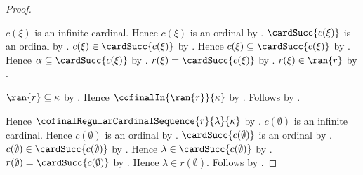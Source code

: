 \begin{proof}
\begin{subproof}
\begin{subproof}
            $c(\xi)$ is an infinite cardinal.
            Hence $c(\xi)$ is an ordinal by
                .
            $\cardSucc{c(\xi)}$ is an ordinal by
                .
            $c(\xi)\in\cardSucc{c(\xi)}$ by
                .
            Hence $c(\xi)\subseteq\cardSucc{c(\xi)}$ by
                .
            Hence $\alpha\subseteq\cardSucc{c(\xi)}$ by
                .
            $r(\xi)=\cardSucc{c(\xi)}$ by
                .
            $r(\xi)\in\ran{r}$ by .
        \end{subproof}
        $\ran{r}\subseteq\kappa$ by .
        Hence $\cofinalIn{\ran{r}}{\kappa}$ by .
        Follows by .
    \end{subproof}
    Hence $\cofinalRegularCardinalSequence{r}{\lambda}{\kappa}$ by
        .
    $c(\emptyset)$ is an infinite cardinal.
    Hence $c(\emptyset)$ is an ordinal by
        .
    $\cardSucc{c(\emptyset)}$ is an ordinal by
        .
    $c(\emptyset)\in\cardSucc{c(\emptyset)}$ by
        .
    Hence $\lambda\in\cardSucc{c(\emptyset)}$ by
        .
    $r(\emptyset)=\cardSucc{c(\emptyset)}$ by
        .
    Hence $\lambda\in r(\emptyset)$.
    Follows by \auto.
\end{proof}
